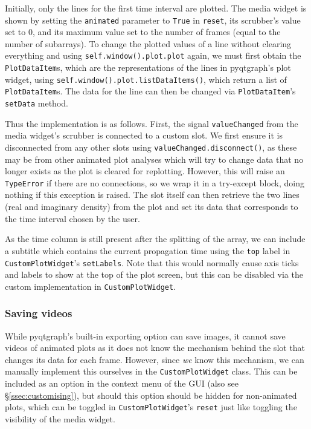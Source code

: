 \documentclass[12pt]{article}
\begin{document}
Initially, only the lines for the first time interval are plotted. The media widget is shown by setting the \texttt{animated} parameter to \texttt{True} in \texttt{reset}, its scrubber's value set to 0, and its maximum value set to the number of frames (equal to the number of subarrays). To change the plotted values of a line without clearing everything and using \texttt{self.window().plot.plot} again, we must first obtain the \texttt{PlotDataItem}s, which are the representations of the lines in pyqtgraph's plot widget, using \texttt{self.window().plot.listDataItems()}, which return a list of \texttt{PlotDataItem}s. The data for the line can then be changed via \texttt{PlotDataItem}'s \texttt{setData} method.

Thus the implementation is as follows. First, the signal \texttt{valueChanged} from the media widget's scrubber is connected to a custom slot. We first ensure it is disconnected from any other slots using \texttt{valueChanged.disconnect()}, as these may be from other animated plot analyses which will try to change data that no longer exists as the plot is cleared for replotting. However, this will raise an \texttt{TypeError} if there are no connections, so we wrap it in a try-except block, doing nothing if this exception is raised. The slot itself can then retrieve the two lines (real and imaginary density) from the plot and set its data that corresponds to the time interval chosen by the user.

As the time column is still present after the splitting of the array, we can include a subtitle which contains the current propagation time using the \texttt{top} label in \texttt{CustomPlotWidget}'s \texttt{setLabels}. Note that this would normally cause axis ticks and labels to show at the top of the plot screen, but this can be disabled via the custom implementation in \texttt{CustomPlotWidget}.

\subsubsection{Saving videos}\label{sssec:save_videos}

While pyqtgraph's built-in exporting option can save images, it cannot save videos of animated plots as it does not know the mechanism behind the slot that changes its data for each frame. However, since \textit{we} know this mechanism, we can manually implement this ourselves in the \texttt{CustomPlotWidget} class. This can be included as an option in the context menu of the GUI (also see \S\ref{ssec:customising}), but should this option should be hidden for non-animated plots, which can be toggled in \texttt{CustomPlotWidget}'s \texttt{reset} just like toggling the visibility of the media widget.
\end{document}
